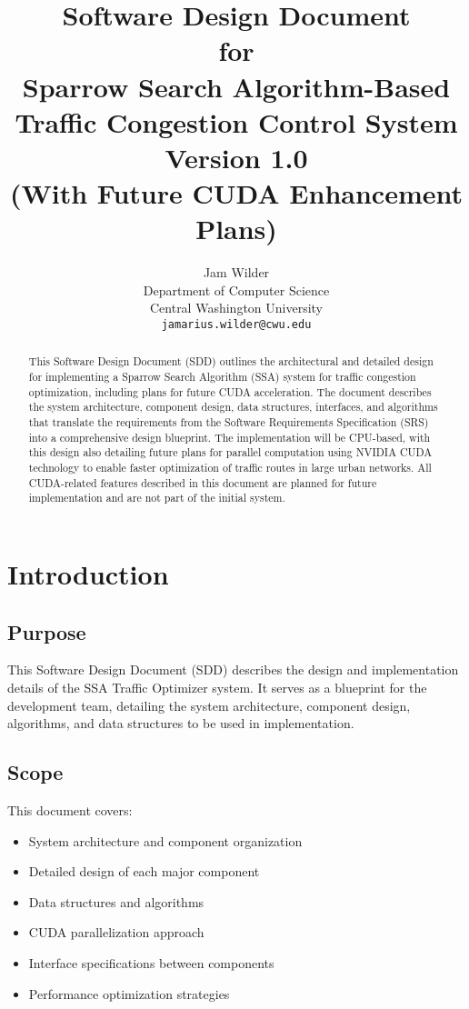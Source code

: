 \documentclass[conference]{IEEEtran}
\title{Software Design Document\\
       for\\
       Sparrow Search Algorithm-Based Traffic Congestion Control System\\
       Version 1.0\\
       (With Future CUDA Enhancement Plans)}
\author{Jam Wilder \\
Department of Computer Science \\
Central Washington University \\
\texttt{jamarius.wilder@cwu.edu}}
\begin{document}
\maketitle

\begin{abstract}
This Software Design Document (SDD) outlines the architectural and detailed design for implementing a Sparrow Search Algorithm (SSA) system for traffic congestion optimization, including plans for future CUDA acceleration. The document describes the system architecture, component design, data structures, interfaces, and algorithms that translate the requirements from the Software Requirements Specification (SRS) into a comprehensive design blueprint. The implementation will be CPU-based, with this design also detailing future plans for parallel computation using NVIDIA CUDA technology to enable faster optimization of traffic routes in large urban networks. All CUDA-related features described in this document are planned for future implementation and are not part of the initial system.
\end{abstract}

\tableofcontents

\newpage

\section{Introduction}

\subsection{Purpose}
This Software Design Document (SDD) describes the design and implementation details of the SSA Traffic Optimizer system. It serves as a blueprint for the development team, detailing the system architecture, component design, algorithms, and data structures to be used in implementation.

\subsection{Scope}
This document covers:
\begin{itemize}
    \item System architecture and component organization
    \item Detailed design of each major component
    \item Data structures and algorithms
    \item CUDA parallelization approach
    \item Interface specifications between components
    \item Performance optimization strategies
\end{itemize}
\end{document}
